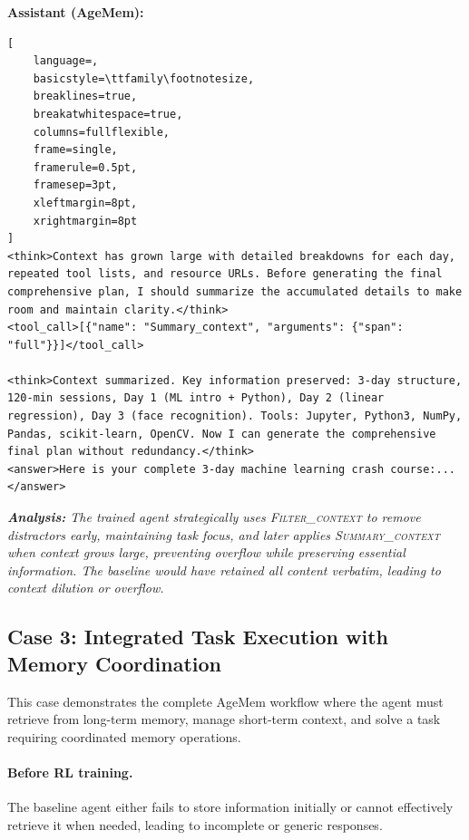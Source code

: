\vspace{0.2cm}
\noindent\textbf{Assistant (AgeMem):}
\begin{footnotesize}
\begin{lstlisting}[
    language=,
    basicstyle=\ttfamily\footnotesize,
    breaklines=true,
    breakatwhitespace=true,
    columns=fullflexible,
    frame=single,
    framerule=0.5pt,
    framesep=3pt,
    xleftmargin=8pt,
    xrightmargin=8pt
]
<think>Context has grown large with detailed breakdowns for each day, repeated tool lists, and resource URLs. Before generating the final comprehensive plan, I should summarize the accumulated details to make room and maintain clarity.</think>
<tool_call>[{"name": "Summary_context", "arguments": {"span": "full"}}]</tool_call>

<think>Context summarized. Key information preserved: 3-day structure, 120-min sessions, Day 1 (ML intro + Python), Day 2 (linear regression), Day 3 (face recognition). Tools: Jupyter, Python3, NumPy, Pandas, scikit-learn, OpenCV. Now I can generate the comprehensive final plan without redundancy.</think>
<answer>Here is your complete 3-day machine learning crash course:...</answer>
\end{lstlisting}
\end{footnotesize}

\vspace{0.25cm}
\noindent\textit{\textbf{Analysis:} The trained agent strategically uses \textsc{Filter\_context} to remove distractors early, maintaining task focus, and later applies \textsc{Summary\_context} when context grows large, preventing overflow while preserving essential information. The baseline would have retained all content verbatim, leading to context dilution or overflow.}

\subsection{Case 3: Integrated Task Execution with Memory Coordination}

This case demonstrates the complete AgeMem workflow where the agent must retrieve from long-term memory, manage short-term context, and solve a task requiring coordinated memory operations.

\paragraph{Before RL training.}
The baseline agent either fails to store information initially or cannot effectively retrieve it when needed, leading to incomplete or generic responses.

